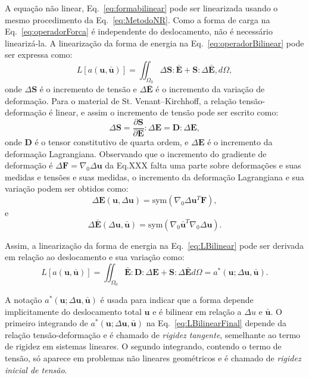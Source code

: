 A equação não linear, Eq.~\eqref{eq:formabilinear} pode ser linearizada usando o mesmo procedimento da Eq.~\eqref{eq:MetodoNR}. Como a forma de carga na Eq.~\eqref{eq:operadorForca} é independente do deslocamento, não é necessário linearizá-la. A linearização da forma de energia na Eq.~\eqref{eq:operadorBilinear} pode ser expressa como:
\begin{equation}\label{eq:LBilinear}
	L[a(\mathbf{u},\mathbf{\bar{u}})] = \iint_{\Omega_0} \Delta \mathbf{S} : \mathbf{\bar{E}} + \mathbf{S} : \Delta \mathbf{\bar{E}} , d\Omega,
\end{equation}
onde $\Delta \mathbf{S}$ é o incremento de tensão e $\Delta \mathbf{\bar{E}}$ é o incremento da variação de deformação. Para o material de St. Venant–Kirchhoff, a relação tensão-deformação é linear, e assim o incremento de tensão pode ser escrito como:
\begin{equation}
	\Delta \mathbf{S} = \frac{\partial \mathbf{S}}{\partial \mathbf{E}} : \Delta \mathbf{E} = \mathbf{D} : \Delta \mathbf{E},
\end{equation}
onde $\mathbf{D}$ é o tensor constitutivo de quarta ordem, e $\Delta \mathbf{E}$ é o incremento da deformação Lagrangiana. Observando que o incremento do gradiente de deformação é $\Delta \mathbf{F} = \nabla_0 \Delta \mathbf{u}$ da Eq.XXX {\color{red} falta uma parte sobre deformações e suas medidas e tensões e suas medidas}, o incremento da deformação Lagrangiana e sua variação podem ser obtidos como:
\begin{equation}
	\Delta \mathbf{E}(\mathbf{u}, \Delta \mathbf{u}) = \text{sym}(\nabla_0 \Delta \mathbf{u}^T \mathbf{F}),
\end{equation}
e
\begin{equation}
	\Delta \mathbf{\bar{E}}(\Delta \mathbf{u}, \mathbf{\bar{u}}) = \text{sym}(\nabla_0 \mathbf{\bar{u}}^T \nabla_0 \Delta \mathbf{u}).
\end{equation}

Assim, a linearização da forma de energia na Eq.~\eqref{eq:LBilinear} pode ser derivada em relação ao deslocamento e sua variação como:
\begin{equation}\label{eq:LBilinearFinal}
	L[a(\mathbf{u},\mathbf{\bar{u}})] = \iint_{\Omega_0} \mathbf{\bar{E}} : \mathbf{D} : \Delta \mathbf{E} + \mathbf{S} : \Delta \mathbf{\bar{E}}  d\Omega = a^*(\mathbf{u}; \Delta \mathbf{u}, \mathbf{\bar{u}}).
\end{equation}

A notação $a^*(\mathbf{u}; \Delta \mathbf{u}, \mathbf{\bar{u}})$ é usada para indicar que a forma depende implicitamente do deslocamento total $\mathbf{u}$ e é bilinear em relação a $\Delta u$ e $\mathbf{\bar{u}}$. O primeiro integrando de $a^*(\mathbf{u}; \Delta \mathbf{u}, \mathbf{\bar{u}})$ na Eq.~\eqref{eq:LBilinearFinal} depende da relação tensão-deformação e é chamado de \emph{rigidez tangente}, semelhante ao termo de rigidez em sistemas lineares. O segundo integrando, contendo o termo de tensão, só aparece em problemas não lineares geométricos e é chamado de \emph{rigidez inicial de tensão}.

